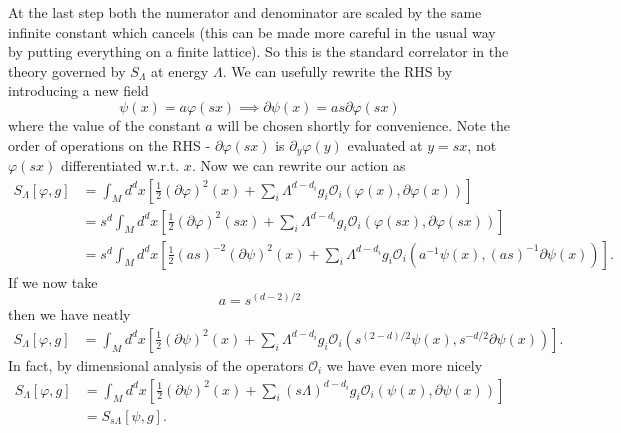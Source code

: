 \documentclass[11pt,letterpaper]{article}
\newcommand{\LP}{\left(}
\newcommand{\RP}{\right)}
\newcommand{\mc}[1]{\mathcal{#1}}
\newcommand{\D}{\partial}
\begin{document}
At the last step both the numerator and denominator are scaled by the same infinite constant which cancels (this can be made more careful in the usual way by putting everything on a finite lattice). So this is the standard correlator in the theory governed by $S_\Lambda$ at energy $\Lambda$. We can usefully rewrite the RHS by introducing a new field \begin{equation}
\psi(x) = a \varphi(sx) \implies \D \psi(x) = as \D \varphi(sx)
\end{equation}
where the value of the constant $a$ will be chosen shortly for convenience. Note the order of operations on the RHS - $\D \varphi (sx)$ is $\D_y \varphi (y)$ evaluated at $y = sx$, not $\varphi(sx)$ differentiated w.r.t. $x$. Now we can rewrite our action as \begin{equation}
\begin{aligned}
S_\Lambda[\varphi, g] & = \int_M d^d x \left[ \frac{1}{2} (\D \varphi)^2(x) + \sum_i \Lambda^{d - d_i} g_i \mc{O}_i( \varphi(x), \D \varphi(x)) \right] \\
& = s^d \int_M d^d x \left[ \frac{1}{2} (\D \varphi)^2(sx) + \sum_i \Lambda^{d - d_i} g_i \mc{O}_i( \varphi(sx), \D \varphi(sx)) \right] \\
& = s^d \int_M d^d x \left[ \frac{1}{2} (as)^{-2} (\D \psi)^2(x) + \sum_i \Lambda^{d - d_i} g_i  \mc{O}_i\LP a^{-1} \psi(x), (as)^{-1} \D \psi(x) \RP \right].
\end{aligned}
\end{equation}
If we now take \begin{equation}
a = s^{(d-2)/2}
\end{equation}
then we have neatly \begin{equation}
\begin{aligned}
S_\Lambda[\varphi, g] & = \int_M d^d x \left[ \frac{1}{2} (\D \psi)^2(x)+ \sum_i \Lambda^{d - d_i} g_i \mc{O}_i\LP s^{(2-d)/2} \psi(x), s^{-d/2} \D \psi(x) \RP \right].
\end{aligned}
\end{equation}
In fact, by dimensional analysis of the operators $\mc{O}_i$ we have even more nicely \begin{equation}
\begin{aligned}
S_\Lambda[\varphi, g] & = \int_M d^d x \left[ \frac{1}{2} (\D \psi)^2(x)+ \sum_i (s \Lambda)^{d - d_i} g_i \mc{O}_i\LP \psi(x), \D \psi(x) \RP \right] \\
& = S_{s \Lambda}[\psi, g].
\end{aligned}
\end{equation}
\end{document}

